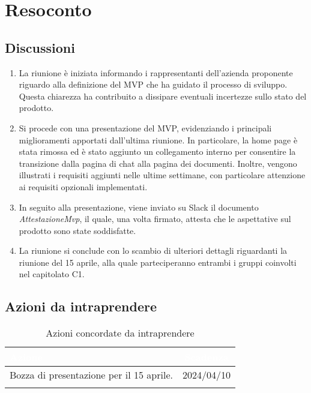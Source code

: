 \section{Resoconto} \label{sec:resoconto}
\subsection{Discussioni} \label{subsec:resdiscussione}
\begin{enumerate}
    \item La riunione è iniziata informando i rappresentanti dell'azienda proponente riguardo alla definizione del MVP che ha guidato il processo di sviluppo. Questa chiarezza ha contribuito a dissipare eventuali incertezze sullo stato del prodotto.
    \item Si procede con una presentazione del MVP, evidenziando i principali miglioramenti apportati dall'ultima riunione. In particolare, la home page è stata rimossa ed è stato aggiunto un collegamento interno per consentire la transizione dalla pagina di chat alla pagina dei documenti. Inoltre, vengono illustrati i requisiti aggiunti nelle ultime settimane, con particolare attenzione ai requisiti opzionali implementati.
    \item In seguito alla presentazione, viene inviato su Slack il documento \textit{AttestazioneMvp}, il quale, una volta firmato, attesta che le aspettative sul prodotto sono state soddisfatte.
    \item La riunione si conclude con lo scambio di ulteriori dettagli riguardanti la riunione del 15 aprile, alla quale parteciperanno entrambi i gruppi coinvolti nel capitolato C1.
\end{enumerate}


\subsection{Azioni da intraprendere} \label{subsec:action}

{
\setlength{\tabcolsep}{10pt}
\renewcommand{\arraystretch}{1.5}
\begin{xltabular}{\textwidth}{| X | c |}
    \hline
     \textbf{\textcolor{white}{Azione}} & \textbf{\textcolor{white}{Scadenza}} \\
    \hline
    \endhead
    Bozza di presentazione per il 15 aprile.  & 2024/04/10\\
    \hline
    
     \caption{Azioni concordate da intraprendere}
    \label{tab:reqimp}
\end{xltabular}
}
